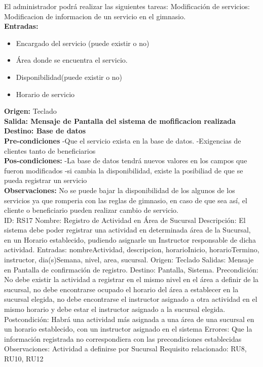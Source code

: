 El administrador podrá realizar las siguientes tareas:
Modificación de servicios: Modificacion de informacion de un servicio en el gimnasio.\\

\textbf{Entradas:} 
\begin{itemize}
          		
          \item Encargado del servicio (puede existir o no)
          \item Área donde se encuentra el servicio.
	  \item Disponibilidad(puede existir o no)
	  \item Horario de servicio
	  
		
	\end{itemize}
      
\textbf{Origen:} Teclado  \\
\textbf{Salida: Mensaje de Pantalla del sistema de mofificacion realizada }  \\
\textbf{Destino: Base de datos }  \\
\textbf{Pre-condiciones }  
-Que el servicio exista en la base de datos.
-Exigencias de clientes tanto de beneficiarios
\\
\textbf{Pos-condiciones: } 
-La base de datos tendrá nuevos valores en los campos que fueron modificados
-si cambia la disponibilidad, existe la posibiliad de que se pueda registrar un servicio\\
\textbf{Observaciones: } No se puede bajar la disponibilidad de los algunos de los servicios ya que romperia con las reglas de gimnasio, en caso de que sea así, el cliente o beneficiario pueden realizar cambio de servicio. \\



ID: RS17
Nombre: Registro de Actividad en Área de Sucursal
Descripción: El sistema debe poder registrar una actividad en determinada área de la Sucursal, en un Horario establecido, pudiendo asignarle un Instructor responsable de dicha actividad.
Entradas: nombreActividad, descripcion, horarioInicio, horarioTermino, instructor, dia(s)Semana, nivel, area, sucursal. 
Origen: Teclado
Salidas: Mensaje en Pantalla de confirmación de registro. 
Destino: Pantalla, Sistema.
Precondición: No debe existir la actividad a registrar en el mismo nivel en el área a definir de la sucursal, no debe encontrarse ocupado el horario del área a establecer en la sucursal elegida, no debe encontrarse el instructor asignado a otra actividad en el mismo horario y debe estar el instructor asignado a la sucursal elegida.
Postcondición: Habrá una actividad más asignada a una área de una sucursal en un horario establecido, con un instructor asignado en el sistema
Errores: Que la información registrada no correspondiera con las precondiciones establecidas
Observaciones: Actividad a definirse por Sucursal
Requisito relacionado: RU8, RU10, RU12

